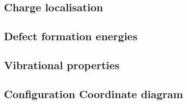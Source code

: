 \subsection{Charge localisation}

\subsection{Defect formation energies}


\subsection{Vibrational properties}

\subsection{Configuration Coordinate diagram}



